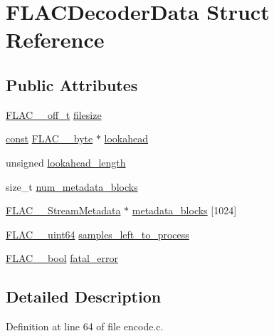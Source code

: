 \hypertarget{struct_f_l_a_c_decoder_data}{}\section{F\+L\+A\+C\+Decoder\+Data Struct Reference}
\label{struct_f_l_a_c_decoder_data}
\subsection*{Public Attributes}
\begin{DoxyCompactItemize}
\item 
\hyperlink{libflac_2include_2share_2compat_8h_a125fb0105eee035da35c6a4999d140eb}{F\+L\+A\+C\+\_\+\+\_\+off\+\_\+t} \hyperlink{struct_f_l_a_c_decoder_data_a7e94980f163509fe82cb538d412ecd7e}{filesize}
\item 
\hyperlink{getopt1_8c_a2c212835823e3c54a8ab6d95c652660e}{const} \hyperlink{ordinals_8h_a5eb569b12d5b047cdacada4d57924ee3}{F\+L\+A\+C\+\_\+\+\_\+byte} $\ast$ \hyperlink{struct_f_l_a_c_decoder_data_a767c99e80e1d1316ffa8a097e4b1adf6}{lookahead}
\item 
unsigned \hyperlink{struct_f_l_a_c_decoder_data_a92020443b708e30df0b9cb3caa692529}{lookahead\+\_\+length}
\item 
size\+\_\+t \hyperlink{struct_f_l_a_c_decoder_data_acd831130440f16b4bed1812a67118b68}{num\+\_\+metadata\+\_\+blocks}
\item 
\hyperlink{struct_f_l_a_c_____stream_metadata}{F\+L\+A\+C\+\_\+\+\_\+\+Stream\+Metadata} $\ast$ \hyperlink{struct_f_l_a_c_decoder_data_acf28dcfe70826a45eddef676a6afd810}{metadata\+\_\+blocks} \mbox{[}1024\mbox{]}
\item 
\hyperlink{ordinals_8h_aa78c8c70a3eb8a58af7436f278acde8e}{F\+L\+A\+C\+\_\+\+\_\+uint64} \hyperlink{struct_f_l_a_c_decoder_data_ab0957e8c76146f3cac5a9f85cbfe6b80}{samples\+\_\+left\+\_\+to\+\_\+process}
\item 
\hyperlink{ordinals_8h_a95103469f1cbd78b8cf250194985b34e}{F\+L\+A\+C\+\_\+\+\_\+bool} \hyperlink{struct_f_l_a_c_decoder_data_a8384d17adcd60b057cbb6ac3486de0e8}{fatal\+\_\+error}
\end{DoxyCompactItemize}


\subsection{Detailed Description}


Definition at line 64 of file encode.\+c.



